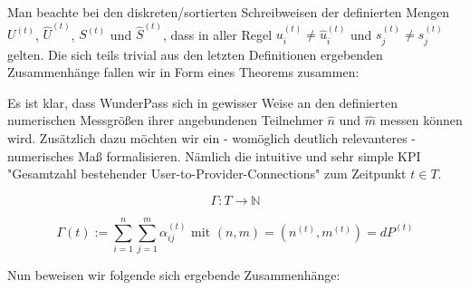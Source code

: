 Man beachte bei den diskreten/sortierten Schreibweisen der definierten Mengen $U^{(t)}$, $\widehat{U}^{(t)}$, $S^{(t)}$ und $\widehat{S}^{(t)}$, dass in aller Regel $u^{(t)}_i \neq \widehat{u}^{(t)}_i$ und $s^{(t)}_j \neq \widehat{s}^{(t)}_j$ gelten. Die sich teils trivial aus den letzten Definitionen ergebenden Zusammenhänge fallen wir in Form eines Theorems zusammen:

\vspace{0.3cm}



Es ist klar, dass WunderPass sich in gewisser Weise an den definierten numerischen Messgrößen ihrer angebundenen Teilnehmer $\widehat{n}$ und $\widehat{m}$ messen können wird. Zusätzlich dazu möchten wir ein - womöglich deutlich relevanteres - numerisches Maß formalisieren. Nämlich die intuitive und sehr simple KPI "Gesamtzahl bestehender User-to-Provider-Connections" zum Zeitpunkt $t \in T$.

\vspace{0.3cm}

\begin{Def}\label{defGamma}

\begin{equation*}
  \Gamma : T \rightarrow \mathbb{N} 
\end{equation*}

\begin{equation*}
  \Gamma(t):= \sum_{i=1}^n \sum_{j=1}^m \alpha^{(t)}_{ij} \textrm{ mit } (n, m) = \left(n^{(t)}, m^{(t)}\right) = dP^{(t)}
\end{equation*}

\end{Def}

\vspace{0.6cm}

Nun beweisen wir folgende sich ergebende Zusammenhänge:

